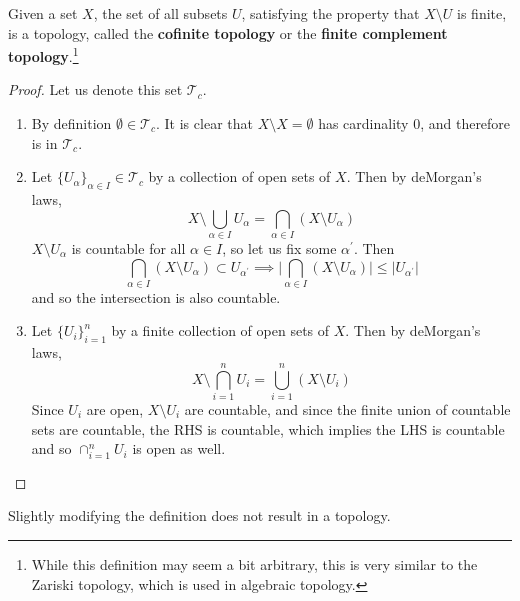     \begin{theorem}
      Given a set $X$, the set of all subsets $U$, satisfying the property that $X \setminus U$ is finite, is a topology, called the \textbf{cofinite topology} or the \textbf{finite complement topology}.\footnote{While this definition may seem a bit arbitrary, this is very similar to the Zariski topology, which is used in algebraic topology.} 
    \end{theorem}
    \begin{proof}
      Let us denote this set $\mathscr{T}_c$. 
      \begin{enumerate}
        \item By definition $\emptyset \in \mathscr{T}_c$. It is clear that $X \setminus X = \emptyset$ has cardinality $0$, and therefore is in $\mathscr{T}_c$. 

        \item Let $\{U_\alpha\}_{\alpha \in I} \in \mathcal{T}_c$ by a collection of open sets of $X$. Then by deMorgan's laws, 
        \begin{equation}
          X \setminus \bigcup_{\alpha \in I} U_{\alpha} = \bigcap_{\alpha \in I} (X \setminus U_\alpha)
        \end{equation}
        $X \setminus U_\alpha$ is countable for all $\alpha \in I$, so let us fix some $\alpha^\prime$. Then 
        \begin{equation}
          \bigcap_{\alpha \in I} (X \setminus U_\alpha) \subset U_{\alpha^\prime} \implies \bigg| \bigcap_{\alpha \in I} (X \setminus U_\alpha) \bigg| \leq \big| U_{\alpha^\prime} \big| 
        \end{equation}
        and so the intersection is also countable. 

        \item Let $\{U_i\}_{i=1}^n$ by a finite collection of open sets of $X$. Then by deMorgan's laws, 
        \begin{equation}
          X \setminus \bigcap_{i=1}^n U_i = \bigcup_{i=1}^n (X \setminus U_i)
        \end{equation}
        Since $U_i$ are open, $X \setminus U_i$ are countable, and since the finite union of countable sets are countable, the RHS is countable, which implies the LHS is countable and so $\cap_{i=1}^n U_i$ is open as well. 
      \end{enumerate}
    \end{proof} 

    Slightly modifying the definition does not result in a topology. 

